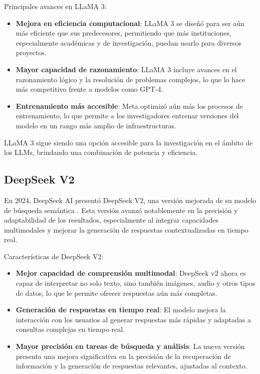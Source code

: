 Principales avances en LLaMA 3:
\begin{itemize}
    \item \textbf{Mejora en eficiencia computacional}: LLaMA 3 se diseñó para ser aún más eficiente que sus predecesores, permitiendo que más instituciones, especialmente académicas y de investigación, puedan usarlo para diversos proyectos.
    \item \textbf{Mayor capacidad de razonamiento}: LLaMA 3 incluye avances en el razonamiento lógico y la resolución de problemas complejos, lo que lo hace más competitivo frente a modelos como GPT-4.
    \item \textbf{Entrenamiento más accesible}: Meta optimizó aún más los procesos de entrenamiento, lo que permite a los investigadores entrenar versiones del modelo en un rango más amplio de infraestructuras.
\end{itemize}

LLaMA 3 sigue siendo una opción accesible para la investigación en el ámbito de los LLMs, brindando una combinación de potencia y eficiencia.


\subsection{DeepSeek V2}

En 2024, DeepSeek AI presentó DeepSeek V2, una versión mejorada de su modelo de búsqueda semántica \cite{deepseekai2024deepseekv2strongeconomicalefficient}. 
Esta versión avanzó notablemente en la precisión y adaptabilidad de los resultados, especialmente al integrar capacidades multimodales y mejorar la generación de respuestas contextualizadas en tiempo real.

Características de DeepSeek V2:
\begin{itemize}
    \item \textbf{Mejor capacidad de comprensión multimodal}: DeepSeek v2 ahora es capaz de interpretar no solo texto, sino también imágenes, audio y otros tipos de datos, lo que le permite ofrecer respuestas aún más completas.
    \item \textbf{Generación de respuestas en tiempo real}: El modelo mejora la interacción con los usuarios al generar respuestas más rápidas y adaptadas a consultas complejas en tiempo real.
    \item \textbf{Mayor precisión en tareas de búsqueda y análisis}: La nueva versión presenta una mejora significativa en la precisión de la recuperación de información y la generación de respuestas relevantes, ajustadas al contexto.
\end{itemize}

